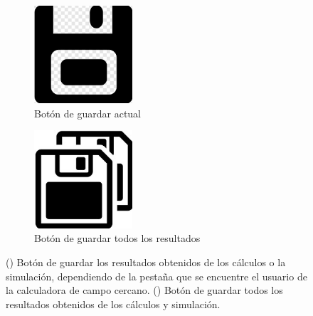 \begin{figure}[H]
	\centering
	\begin{subfigure}[b]{0.48\textwidth}
		\centering
		\includegraphics[width=0.4\textwidth]{figuras/Procedimiento_Simulaciones/Radiacion/SaveButton_Cut.jpg}
		\caption{Botón de guardar actual}
		\label{fig:SaveButton_Cut}
	\end{subfigure}
  \hfill
	\begin{subfigure}[b]{0.48\textwidth}
		\centering
			\includegraphics[width=0.40\textwidth]{figuras/Procedimiento_Simulaciones/Radiacion/SaveAllicon.jpg}
		\caption{Botón de guardar todos los resultados}
		\label{fig:SaveAllicon}
	\end{subfigure}
	\caption{() Botón de guardar los resultados obtenidos de los cálculos o la simulación, dependiendo de la pestaña que se encuentre el usuario de la calculadora de campo cercano. () Botón de guardar todos los resultados obtenidos de los cálculos y simulación.}
	\label{fig:saveButtons}
\end{figure}
